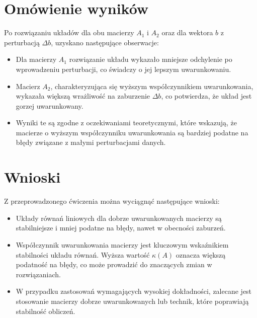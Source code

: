 \documentclass[a4paper, 12pt]{article}
\begin{document}
\section{Omówienie wyników}
Po rozwiązaniu układów dla obu macierzy \( A_1 \) i \( A_2 \) oraz dla wektora \( b \) z perturbacją \( \Delta b \), uzyskano następujące obserwacje:
\begin{itemize}
    \item Dla macierzy \( A_1 \) rozwiązanie układu wykazało mniejsze odchylenie po wprowadzeniu perturbacji, co świadczy o jej lepszym uwarunkowaniu.
    \item Macierz \( A_2 \), charakteryzująca się wyższym współczynnikiem uwarunkowania, wykazała większą wrażliwość na zaburzenie \( \Delta b \), co potwierdza, że układ jest gorzej uwarunkowany.
    \item Wyniki te są zgodne z oczekiwaniami teoretycznymi, które wskazują, że macierze o wyższym współczynniku uwarunkowania są bardziej podatne na błędy związane z małymi perturbacjami danych.
\end{itemize}

\section{Wnioski}
Z przeprowadzonego ćwiczenia można wyciągnąć następujące wnioski:
\begin{itemize}
    \item Układy równań liniowych dla dobrze uwarunkowanych macierzy są stabilniejsze i mniej podatne na błędy, nawet w obecności zaburzeń.
    \item Współczynnik uwarunkowania macierzy jest kluczowym wskaźnikiem stabilności układu równań. Wyższa wartość \( \kappa(A) \) oznacza większą podatność na błędy, co może prowadzić do znaczących zmian w rozwiązaniach.
    \item W przypadku zastosowań wymagających wysokiej dokładności, zalecane jest stosowanie macierzy dobrze uwarunkowanych lub technik, które poprawiają stabilność obliczeń.
\end{itemize}
\end{document}
